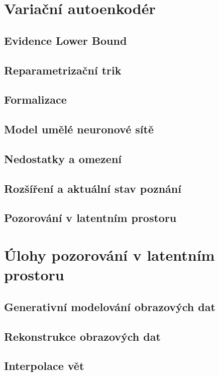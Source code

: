 \documentclass[11pt,a4paper]{report}
\begin{document}
\chapter{Variační autoenkodér}
\label{chap:vae}

\cite{Kingma2013}
\section{Evidence Lower Bound}
\section{Reparametrizační trik}
\section{Formalizace}
\section{Model umělé neuronové sítě}
\section{Nedostatky a omezení}
\section{Rozšíření a aktuální stav poznání}
\section{Pozorování v latentním prostoru}


\chapter{Úlohy pozorování v latentním prostoru}
\label{chap:applications}
\section{Generativní modelování obrazových dat}
\section{Rekonstrukce obrazových dat}
\section{Interpolace vět}
\end{document}
